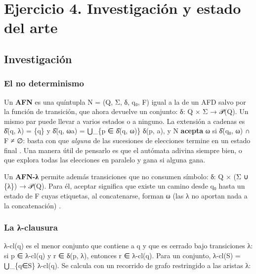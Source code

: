 \hypertarget{ejercicio-4.-investigaciuxf3n-y-estado-del-arte}{%
\section{Ejercicio 4. Investigación y estado del arte}\label{ejercicio-4.-investigaciuxf3n-y-estado-del-arte}}

\hypertarget{investigaciuxf3n}{%
\subsection{Investigación}\label{investigaciuxf3n}}

\hypertarget{el-no-determinismo}{%
\subsubsection{El no determinismo}\label{el-no-determinismo}}

Un \textbf{AFN} es una quíntupla N = (Q, Σ, δ, q₀, F) igual a la de un AFD salvo por la función de transición, que ahora devuelve un conjunto: δ: Q × Σ → 𝒫(Q). Un mismo par puede llevar a varios estados o a ninguno. La extensión a cadenas es δ̂(q, λ) = \{q\} y δ̂(q, ωa) = ⋃\_\{p ∈ δ̂(q, ω)\} δ(p, a), y N \textbf{acepta} ω si δ̂(q₀, ω) ∩ F ≠ ∅: basta con que \emph{alguna} de las sucesiones de elecciones termine en un estado final \autocite[sec.~2.3.2]{hopcroft2007}. Una manera útil de pensarlo es que el autómata adivina siempre bien, o que explora todas las elecciones en paralelo y gana si alguna gana.

Un \textbf{AFN-λ} permite además transiciones que no consumen símbolo: δ: Q × (Σ ∪ \{λ\}) → 𝒫(Q). Para él, aceptar significa que existe un camino desde q₀ hasta un estado de F cuyas etiquetas, al concatenarse, forman ω (las λ no aportan nada a la concatenación) \autocite[sec.~1.2]{sipser2013}.

\hypertarget{la-ux3bb-clausura}{%
\subsubsection{La λ-clausura}\label{la-ux3bb-clausura}}

λ-cl(q) es el menor conjunto que contiene a q y que es cerrado bajo transiciones λ: si p ∈ λ-cl(q) y r ∈ δ(p, λ), entonces r ∈ λ-cl(q). Para un conjunto, λ-cl(S) = ⋃\_\{q∈S\} λ-cl(q). Se calcula con un recorrido de grafo restringido a las aristas λ:

\begin{Shaded}
\begin{Highlighting}[]
\end{Highlighting}
\end{Shaded}

